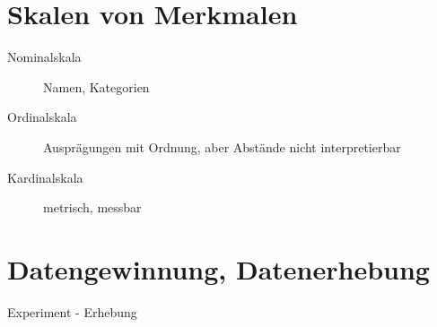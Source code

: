 \section{Skalen von Merkmalen}
\begin{description}
	\item[Nominalskala]
		Namen, Kategorien
	\item[Ordinalskala]
		Ausprägungen mit Ordnung, aber Abstände nicht interpretierbar
	\item[Kardinalskala]
		metrisch, messbar
\end{description}

\section{Datengewinnung, Datenerhebung}
Experiment - Erhebung


